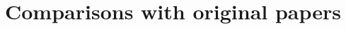 \clearpage
\onecolumn
\section{Comparisons with original papers}
\label{app:comparisons_with_original_papers}



\twocolumn
